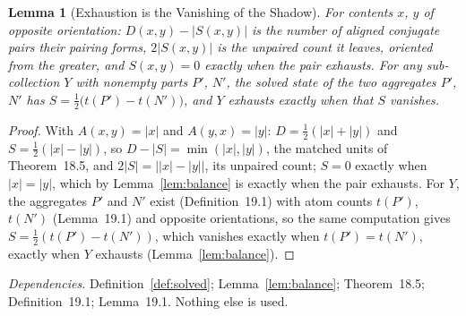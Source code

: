 \documentclass[pdflatex,sn-mathphys-num]{sn-jnl}
\theoremstyle{thmstyleone}%
\newtheorem{lemma}[theorem]{Lemma}
\theoremstyle{thmstyletwo}%
\theoremstyle{thmstylethree}%
\newtheorem{lemma}[theorem]{Lemma}
\newcommand{\deps}[1]{\par\begin{sloppypar}\noindent\emph{Dependencies.} #1 Nothing else is used.\end{sloppypar}}
\begin{document}
\begin{lemma}[Exhaustion is the Vanishing of the Shadow]\label{lem:shadow}
For contents $x$, $y$ of opposite orientation: $D(x,y)-|S(x,y)|$ is the number of aligned conjugate pairs their pairing forms, $2|S(x,y)|$ is the unpaired count it leaves, oriented from the greater, and $S(x,y)=0$ exactly when the pair exhausts. For any sub-collection $Y$ with nonempty parts $P'$, $N'$, the solved state of the two aggregates $P'$, $N'$ has $S=\tfrac12\bigl(t(P')-t(N')\bigr)$, and $Y$ exhausts exactly when that $S$ vanishes.
\end{lemma}
\begin{proof}
With $A(x,y)=|x|$ and $A(y,x)=|y|$: $D=\tfrac12(|x|+|y|)$ and $S=\tfrac12(|x|-|y|)$, so $D-|S|=\min(|x|,|y|)$, the matched units of Theorem~18.5, and $2|S|=\bigl||x|-|y|\bigr|$, its unpaired count; $S=0$ exactly when $|x|=|y|$, which by Lemma~\ref{lem:balance} is exactly when the pair exhausts. For $Y$, the aggregates $P'$ and $N'$ exist (Definition~19.1) with atom counts $t(P')$, $t(N')$ (Lemma~19.1) and opposite orientations, so the same computation gives $S=\tfrac12(t(P')-t(N'))$, which vanishes exactly when $t(P')=t(N')$, exactly when $Y$ exhausts (Lemma~\ref{lem:balance}).
\end{proof}
\deps{Definition~\ref{def:solved}; Lemma~\ref{lem:balance}; Theorem~18.5; Definition~19.1; Lemma~19.1.}
\end{document}
